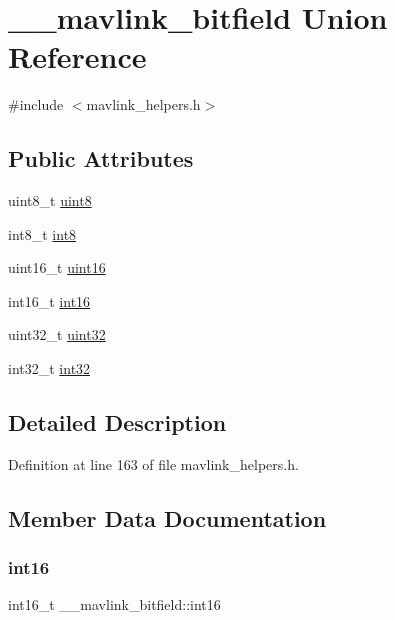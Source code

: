 \hypertarget{union____mavlink__bitfield}{}\section{\+\_\+\+\_\+mavlink\+\_\+bitfield Union Reference}
\label{union____mavlink__bitfield}


{\ttfamily \#include $<$mavlink\+\_\+helpers.\+h$>$}

\subsection*{Public Attributes}
\begin{DoxyCompactItemize}
\item 
uint8\+\_\+t \mbox{\hyperlink{union____mavlink__bitfield_ade669a5f63c53f0d61f636eff94417c0}{uint8}}
\item 
int8\+\_\+t \mbox{\hyperlink{union____mavlink__bitfield_a50a846d427d7a1d7dc79235c87597622}{int8}}
\item 
uint16\+\_\+t \mbox{\hyperlink{union____mavlink__bitfield_a0ca76ce4a09ee26387e50b6702c17894}{uint16}}
\item 
int16\+\_\+t \mbox{\hyperlink{union____mavlink__bitfield_a99cd7f966d8a59b29d05197b39c5b229}{int16}}
\item 
uint32\+\_\+t \mbox{\hyperlink{union____mavlink__bitfield_ab43ed56310c2d778ebaa7a5a21cb6587}{uint32}}
\item 
int32\+\_\+t \mbox{\hyperlink{union____mavlink__bitfield_a07bd702e8b91679a25e632ad90d0a1ec}{int32}}
\end{DoxyCompactItemize}


\subsection{Detailed Description}


Definition at line 163 of file mavlink\+\_\+helpers.\+h.



\subsection{Member Data Documentation}
\mbox{\label{union____mavlink__bitfield_a99cd7f966d8a59b29d05197b39c5b229}} 
\subsubsection{\texorpdfstring{int16}{int16}}
{\footnotesize\ttfamily int16\+\_\+t \+\_\+\+\_\+mavlink\+\_\+bitfield\+::int16}



